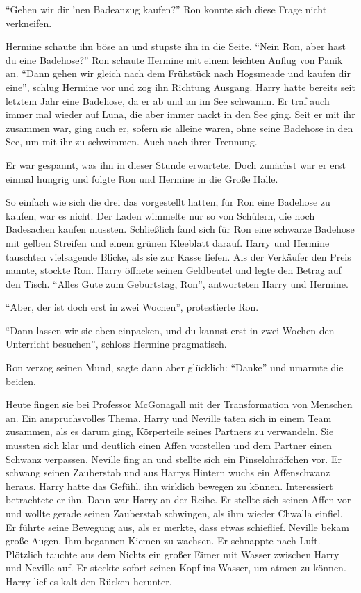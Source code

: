 \enquote{Gehen wir dir 'nen Badeanzug kaufen?} Ron konnte sich diese Frage nicht verkneifen.

Hermine schaute ihn böse an und stupste ihn in die Seite. \enquote{Nein Ron, aber hast du eine Badehose?} Ron schaute Hermine mit einem leichten Anflug von Panik an. \enquote{Dann gehen wir gleich nach dem Frühstück nach Hogsmeade und kaufen dir eine}, schlug Hermine vor und zog ihn Richtung Ausgang. Harry hatte bereits seit letztem Jahr eine Badehose, da er ab und an im See schwamm. Er traf auch immer mal wieder auf Luna, die aber immer nackt in den See ging. Seit er mit ihr zusammen war, ging auch er, sofern sie alleine waren, ohne seine Badehose in den See, um mit ihr zu schwimmen. Auch nach ihrer Trennung.

Er war gespannt, was ihn in dieser Stunde erwartete. Doch zunächst war er erst einmal hungrig und folgte Ron und Hermine in die Große Halle.

So einfach wie sich die drei das vorgestellt hatten, für Ron eine Badehose zu kaufen, war es nicht. Der Laden wimmelte nur so von Schülern, die noch Badesachen kaufen mussten. Schließlich fand sich für Ron eine schwarze Badehose mit gelben Streifen und einem grünen Kleeblatt darauf. Harry und Hermine tauschten vielsagende Blicke, als sie zur Kasse liefen. Als der Verkäufer den Preis nannte, stockte Ron. Harry öffnete seinen Geldbeutel und legte den Betrag auf den Tisch. \enquote{Alles Gute zum Geburtstag, Ron}, antworteten Harry und Hermine.

\enquote{Aber, der ist doch erst in zwei Wochen}, protestierte Ron.

\enquote{Dann lassen wir sie eben einpacken, und du kannst erst in zwei Wochen den Unterricht besuchen}, schloss Hermine pragmatisch.

Ron verzog seinen Mund, sagte dann aber glücklich: \enquote{Danke} und umarmte die beiden.

\trenn

Heute fingen sie bei Professor McGonagall mit der Transformation von Menschen an. Ein anspruchsvolles Thema. Harry und Neville taten sich in einem Team zusammen, als es darum ging, Körperteile seines Partners zu verwandeln. Sie mussten sich klar und deutlich einen Affen vorstellen und dem Partner einen Schwanz verpassen. Neville fing an und stellte sich ein Pin\-sel\-ohr\-äff\-chen vor. Er schwang seinen Zauberstab und aus Harrys Hintern wuchs ein Affenschwanz heraus. Harry hatte das Gefühl, ihn wirklich bewegen zu können. Interessiert betrachtete er ihn. Dann war Harry an der Reihe. Er stellte sich seinen Affen vor und wollte gerade seinen Zauberstab schwingen, als ihm wieder Chwalla einfiel. Er führte seine Bewegung aus, als er merkte, dass etwas schieflief. Neville bekam große Augen. Ihm begannen Kiemen zu wachsen. Er schnappte nach Luft. Plötzlich tauchte aus dem Nichts ein großer Eimer mit Wasser zwischen Harry und Neville auf. Er steckte sofort seinen Kopf ins Wasser, um atmen zu können. Harry lief es kalt den Rücken herunter.

